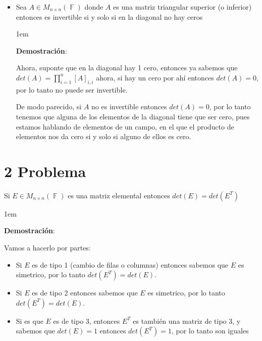 \documentclass[12pt, fleqn]{article}                             %
\newenvironment{SmallIndentation}[1][0.75em]                    %
        {\begin{adjustwidth}{#1}{}\begin{footnotesize}}             %
        {\end{footnotesize}\end{adjustwidth}}                       %
\theoremstyle{break}                                            %
\DeclareMathOperator \GenericField {\mathbb{F}}                 %
\begin{document}
\begin{itemize}
        \item
            Sea $A \in M_{n \times n}(\GenericField)$ donde $A$ es una matriz triangular
            superior (o inferior) entonces es invertible si y solo si en la diagonal no hay ceros

            \begin{SmallIndentation}[1em]
                \textbf{Demostración}:
                
                Ahora, suponte que en la diagonal hay 1 cero, entonces ya sabemos que 
                $det(A) = \prod_{i = 1}^n [A]_{i, i}$ ahora, si hay un cero por ahí entonces
                $det(A) = 0$, por lo tanto no puede ser invertible.

                De modo parecido, si $A$ no es invertible entonces $det(A) = 0$, por lo tanto
                tenemos que alguna de los elementos de la diagonal tiene que ser cero, pues estamos hablando
                de elementos de un campo, en el que el producto de elementos nos da cero si y solo si alguno de 
                ellos es cero.

            \end{SmallIndentation}
   \end{itemize}



\clearpage
\section{2 Problema}

    Si $E \in M_{n \times n}(\GenericField)$ es una matriz elemental
    entonces $det(E) = det(E^T)$

    \begin{SmallIndentation}[1em]
        \textbf{Demostración}:
        
        Vamos a hacerlo por partes:
        \begin{itemize}
            
            \item 
                Si $E$ es de tipo 1 (cambio de filas o columnas) entonces
                sabemos que $E$ es simetrico, por lo tanto $det(E^T) = det(E)$.

            \item 
                Si $E$ es de tipo 2 entonces sabemos que $E$ es simetrico,
                por lo tanto $det(E^T) = det(E)$.

            \item
                Si es que $E$ es de tipo 3, entonces $E^T$ es también una matriz 
                de tipo 3, y sabemos que $det(E) = 1$ entonces $det(E^T) = 1$, por lo
                tanto son iguales 
        \end{itemize}
    
    \end{SmallIndentation}
\end{document}
